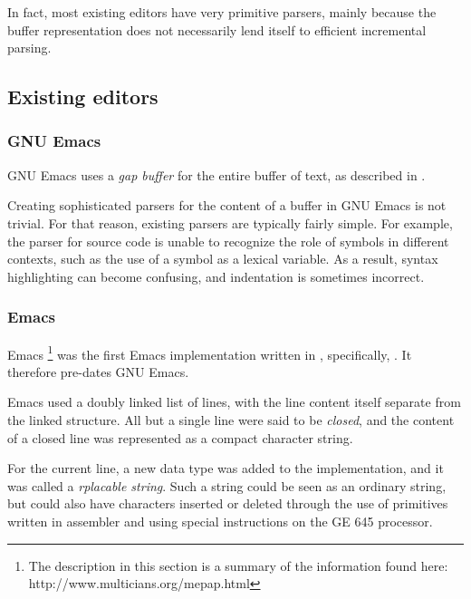 In fact, most existing editors have very primitive parsers, mainly
because the buffer representation does not necessarily lend itself to
efficient incremental parsing.

\subsection{Existing editors}

\subsubsection{GNU Emacs}

GNU Emacs \cite{GNUEmacsLispReferenceManual}
\cite{CraftOfTextEditiing} uses a \emph{gap buffer} for the entire
buffer of text, as described in .

Creating sophisticated parsers for the content of a buffer in GNU
Emacs is not trivial.  For that reason, existing parsers are typically
fairly simple.  For example, the parser for \commonlisp{} source code
is unable to recognize the role of symbols in different contexts, such
as the use of a \commonlisp{} symbol as a lexical variable.  As a
result, syntax highlighting can become confusing, and indentation is
sometimes incorrect.

\subsubsection{\multics{} Emacs}

\multics{} Emacs%
\footnote{The description in this section is a summary of the
  information found here: http://www.multicians.org/mepap.html}
\cite{Greenberg:1980:MEC:800087.802784}
was the first Emacs implementation written in \lisp{}, specifically,
\multics{} \maclisp{}.  It therefore pre-dates GNU Emacs.

\multics{} Emacs used a doubly linked list of lines, with the line
content itself separate from the linked structure.  All but a single
line were said to be \emph{closed}, and the content of a closed line
was represented as a compact character string.

For the current line, a new \maclisp{} data type was added to the
\multics{} \maclisp{} implementation, and it was called a
\emph{rplacable string}.  Such a string could be seen as an ordinary
\maclisp{} string, but could also have characters inserted or deleted
through the use of primitives written in assembler and using special
instructions on the GE 645 processor.

